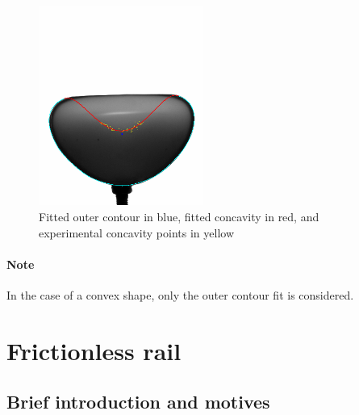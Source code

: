\begin{figure}[H] %
	\centering%
  \includegraphics[width=0.48\textwidth]{figures/Chapter_1/outer_contour_complete.png}
	\caption{Fitted outer contour in blue, fitted concavity in red, and experimental concavity points in yellow}
	\label{fig:fit_complet}
\end{figure}
\paragraph{Note}
In the case of a convex shape, only the outer contour fit is considered.
\newpage
\section{Frictionless rail}
\subsection{Brief introduction and motives}

